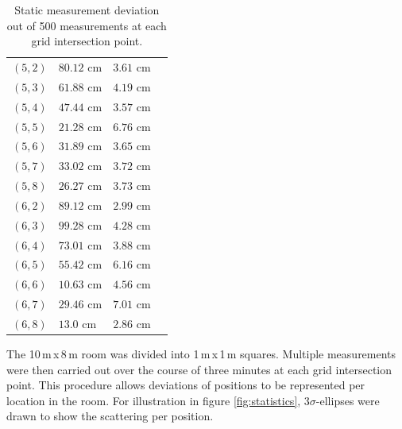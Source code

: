 \documentclass[final, conference, a4paper]{IEEEtran}
\begin{document}
\begin{table}[hbt!]
\begin{tabular}{l l l c}
		$(5,2)$ & $80.12$ cm & $3.61$ cm\\
		$(5,3)$ & $61.88$ cm & $4.19$ cm\\
		$(5,4)$ & $47.44$ cm & $3.57$ cm\\
		$(5,5)$ & $21.28$ cm & $6.76$ cm\\
		$(5,6)$ & $31.89$ cm & $3.65$ cm\\
		$(5,7)$ & $33.02$ cm & $3.72$ cm\\
		$(5,8)$ & $26.27$ cm & $3.73$ cm\\

		$(6,2)$ & $89.12$ cm & $2.99$ cm\\
		$(6,3)$ & $99.28$ cm & $4.28$ cm\\
		$(6,4)$ & $73.01$ cm & $3.88$ cm\\
		$(6,5)$ & $55.42$ cm & $6.16$ cm\\
		$(6,6)$ & $10.63$ cm & $4.56$ cm\\
		$(6,7)$ & $29.46$ cm & $7.01$ cm\\
		$(6,8)$ & $13.0$ cm & $2.86$ cm\\
		
	\end{tabular}
	\caption{Static measurement deviation out of 500 measurements at each grid intersection point.}
	\label{table:measurements}
\end{table}

The 10\,m\,x\,8\,m room was divided into 1\,m\,x\,1\,m squares. 
Multiple measurements were then carried out over the course of three minutes at each grid intersection point.
This procedure allows deviations of positions to be represented per location in the room.
For illustration in figure \ref{fig:statistics}, $3\sigma$-ellipses were drawn to show the scattering per position.
\end{document}
